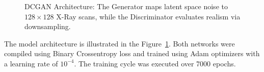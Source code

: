 \begin{figure}[ht!]
{
    }
    \caption{DCGAN Architecture: The Generator maps latent space noise
      to $128 \times 128$ X-Ray scans, while the Discriminator
      evaluates realism via downsampling.}
    \label{fig:dcgan_arch}
\end{figure}

The model architecture is illustrated in the
Figure~\ref{fig:dcgan_arch}. Both networks were compiled using Binary
Crossentropy loss and trained using Adam optimizers with a learning
rate of $10^{-4}$. The training cycle was executed over 7000 epochs.